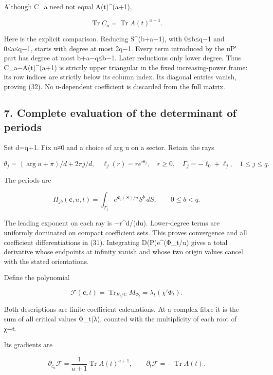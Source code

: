 Although C\_a need not equal A(t)\^{}(a+1),

\[
\boxed{\operatorname{Tr}C_a=\operatorname{Tr}A(t)^{a+1}.}
\tag{32}
\]

Here is the explicit comparison. Reducing S\^{}(b+a+1), with 0≤b≤q−1 and 0≤a≤q−1, starts with degree at most 2q−1. Every term introduced by the uP′ part has degree at most b+a−q≤b−1. Later reductions only lower degree. Thus C\_a−A(t)\^{}(a+1) is strictly upper triangular in the fixed increasing-power frame: its row indices are strictly below its column index. Its diagonal entries vanish, proving (32). No u-dependent coefficient is discarded from the full matrix.

\subsection{7. Complete evaluation of the determinant of periods}\label{endpoint-sga_trace_period--complete-evaluation-of-the-determinant-of-periods}

Set d=q+1. Fix u≠0 and a choice of arg u on a sector. Retain the rays

\[
\theta_j=(\arg u+\pi)/d+2\pi j/d,
\quad\ell_j(r)=re^{i\theta_j},\quad r\ge0,
\quad\Gamma_j=-\ell_0+\ell_j,\quad1\le j\le q.
\tag{33}
\]

The periods are

\[
\Pi_{jb}(\mathbf c,u,t)=\int_{\Gamma_j}e^{\Phi_t(S)/u}S^b\,dS,
\qquad0\le b<q.
\tag{34}
\]

The leading exponent on each ray is −r\^{}d/(d\textbar u\textbar). Lower-degree terms are uniformly dominated on compact coefficient sets. This proves convergence and all coefficient differentiations in (31). Integrating D(P)e\^{}(Φ\_t/u) gives a total derivative whose endpoints at infinity vanish and whose two origin values cancel with the stated orientations.

Define the polynomial

\[
\boxed{\mathcal F(\mathbf c,t)
 =\operatorname{Tr}_{E_t/\mathbb C}M_{\Phi_t}
 =\lambda_t(\chi'\Phi_t).}
\tag{35}
\]

Both descriptions are finite coefficient calculations. At a complex fibre it is the sum of all critical values Φ\_t(λ), counted with the multiplicity of each root of χ−t.

Its gradients are

\[
\boxed{
\partial_{c_a}\mathcal F
 =\frac1{a+1}\operatorname{Tr}A(t)^{a+1},
\qquad
\partial_t\mathcal F=-\operatorname{Tr}A(t).
}
\tag{36}
\]

